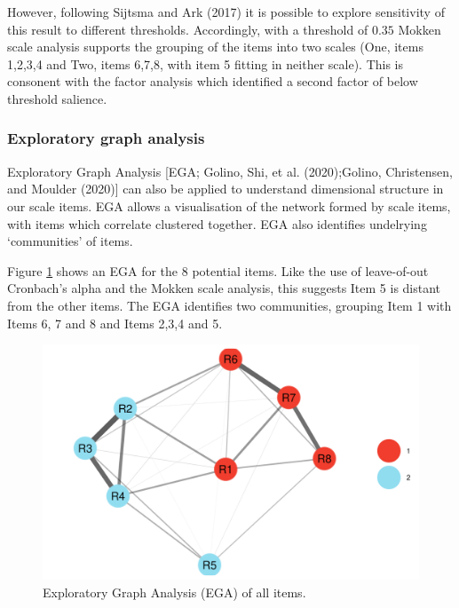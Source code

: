 \documentclass[
  ,jou,floatsintext]{apa6}
\begin{document}
However, following Sijtsma and Ark (2017) it is possible to explore sensitivity of this result to different thresholds. Accordingly, with a threshold of \(0.35\) Mokken scale analysis supports the grouping of the items into two scales (One, items 1,2,3,4 and Two, items 6,7,8, with item 5 fitting in neither scale). This is consonent with the factor analysis which identified a second factor of below threshold salience.

\hypertarget{exploratory-graph-analysis}{%
\subsubsection{Exploratory graph analysis}\label{exploratory-graph-analysis}}

Exploratory Graph Analysis {[}EGA; Golino, Shi, et al. (2020);Golino, Christensen, and Moulder (2020){]} can also be applied to understand dimensional structure in our scale items. EGA allows a visualisation of the network formed by scale items, with items which correlate clustered together. EGA also identifies undelrying `communities' of items.

Figure \ref{fig:egafull} shows an EGA for the 8 potential items. Like the use of leave-of-out Cronbach's alpha and the Mokken scale analysis, this suggests Item 5 is distant from the other items. The EGA identifies two communities, grouping Item 1 with Items 6, 7 and 8 and Items 2,3,4 and 5.

\begin{figure}

{\centering \includegraphics[width=1\linewidth]{plots/reason_ega} 

}

\caption{Exploratory Graph Analysis (EGA) of all items.}\label{fig:egafull}
\end{figure}
\end{document}
